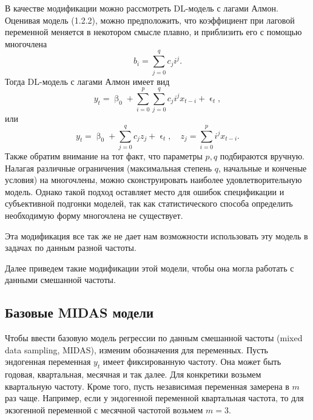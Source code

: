 \documentclass[a4paper, 12pt]{extarticle}
\numberwithin{equation}{subsection}
\renewcommand{\beta}{\upbeta}
\renewcommand{\epsilon}{\upvarepsilon}
\begin{document}
	В качестве модификации можно рассмотреть DL-модель с лагами Алмон. Оценивая модель (1.2.2), можно предположить, что коэффициент при лаговой переменной меняется в некотором смысле плавно, и приблизить его с помощью многочлена 
	\begin{equation}
		b_i = \sum_{j=0}^{q}c_j i^j.
	\end{equation}
	Тогда DL-модель с лагами Алмон имеет вид 
	\begin{equation}
		y_t = \beta_0 + \sum_{i=0}^{p}\sum_{j=0}^{q}c_j i^j x_{t-i} + \epsilon_t,
	\end{equation}
	или 
	\begin{equation}
		y_t = \beta_0 + \sum_{j=0}^{q}c_j z_j + \epsilon_t,\quad z_j = \sum_{i=0}^{p}i^j x_{t-i}.
	\end{equation}
	Также обратим внимание на тот факт, что параметры $p,q$ подбираются вручную. Налагая различные ограничения (максимальная степень $q$, начальные и конченые условия) на многочлены, можно сконструировать наиболее удовлетворительную модель. Однако такой подход оставляет место для ошибок спецификации и субъективной подгонки моделей, так как статистического способа определить необходимую форму многочлена не существует.
	
	Эта модификация все так же не дает нам возможности использовать эту модель в задачах по данным разной частоты. 

	Далее приведем такие модификации этой модели, чтобы она могла работать с данными смешанной частоты.
	\subsection{Базовые MIDAS модели}
	Чтобы ввести базовую модель регрессии по данным смешанной частоты (mixed data sampling, MIDAS), изменим обозначения для переменных. Пусть эндогенная переменная $y_t$ имеет фиксированную частоту. Она может быть годовая, квартальная, месячная и так далее. Для конкретики возьмем квартальную частоту. Кроме того, пусть независимая переменная замерена в $m$ раз чаще. Например, если у эндогенной переменной квартальная частота, то для экзогенной переменной с месячной частотой возьмем $m=3$.
	
\end{document}
